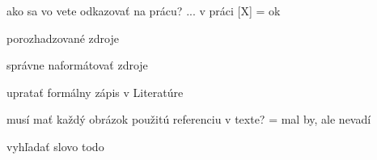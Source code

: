 ako sa vo vete odkazovať na prácu? ... v práci [X]
= ok

porozhadzované zdroje

správne naformátovať zdroje

upratať formálny zápis v Literatúre

musí mať každý obrázok použitú referenciu v texte?
= mal by, ale nevadí

vyhľadať slovo todo

